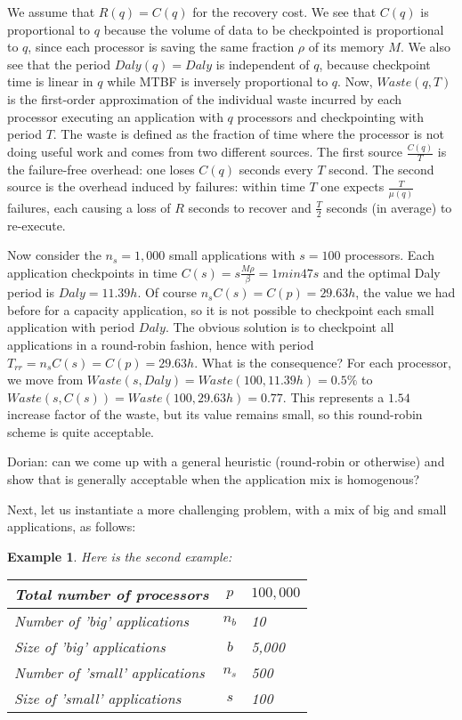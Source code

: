 \documentclass{article}
\newtheorem{example}{Example}
\newcommand{\ema}[1]{\ensuremath{#1}}
\newcommand{\Waste}{\ema{\mathit{Waste}}\xspace}
\newcommand{\Daly}{\ema{\mathit{Daly}}\xspace}
\newcommand{\dca}[1]{{\color{blue}Dorian: #1}}
\begin{document}
We assume that $R(q) =C(q)$ for the recovery cost. We see that $C(q)$ is proportional to $q$ because the volume of data to be checkpointed is proportional to $q$, since each
processor is saving the same fraction $\rho$ of its memory $M$.
We also see that the period $\Daly(q)=\Daly$ is independent of
$q$, because checkpoint time is linear in $q$ while MTBF is inversely proportional to $q$.
Now, $\Waste(q,T)$ is the first-order approximation of the individual waste incurred
by each processor executing an application with $q$ 
processors and checkpointing with period $T$. 
The waste is defined as the fraction of time where the processor is not doing useful work and comes from two different sources. The first source $\frac{C(q)}{T} $ is the failure-free overhead:
one loses $C(q)$ seconds every $T$ second. 
The second source is the overhead induced by failures: within time $T$ one expects $ \frac{T}{\mu(q)}$
failures, each causing a loss of $R$ seconds to recover and $\frac{T}{2}$ seconds (in average) to re-execute.

Now consider the $n_{s}=1,000$ small applications with $s=100$ processors.
Each application checkpoints in time $C(s) = s\frac{M \rho}{\beta}  = 1min47s$
and the optimal Daly period is $\Daly = 11.39h$. Of course
$n_{s}C(s) =  C(p) = 29.63h$, the value we had before for a capacity application, so it is not possible to checkpoint each small application with period
$\Daly$. The obvious solution is to checkpoint all applications in  a round-robin fashion, 
hence with period $T_{rr} = n_{s}C(s) =  C(p) = 29.63h$. What is the consequence? For each processor,
we move from $\Waste(s,\Daly) = \Waste(100,11.39h) = 0.5\%$ to
$\Waste(s,C(s)) = \Waste(100,29.63h) = 0.77$. This represents a $1.54$ increase factor of the waste, but its value remains small, so this round-robin scheme is quite acceptable.

\dca{can we come up with a general heuristic (round-robin or otherwise) and show that
  is generally acceptable when the application mix is homogenous?}

Next, let us instantiate a more challenging problem, with 
a mix of big and small applications, as follows:

\begin{example}
Here is the second example:
\begin{center}
\begin{tabular}{lcl}
  Total number of processors & $p$ & $100,000$\\\hline
  Number of 'big' applications & $n_{b}$ & 10\\\hline
  Size of 'big' applications & $b$ & 5,000\\\hline
  Number of 'small' applications & $n_{s}$ & 500\\\hline
  Size of 'small' applications & $s$ & 100\\\hline
\end{tabular}
\end{center}
\label{example2}
\end{example}
\end{document}
